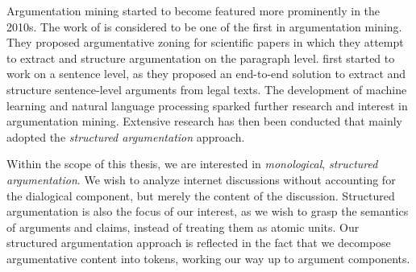 Argumentation mining started to become featured more prominently in the 2010s.
The work of \citet{teufel2009towards} is considered to be one of the first in
argumentation mining. They proposed argumentative zoning for scientific papers
in which they attempt to extract and structure argumentation on the paragraph
level.  \citet{palau2009argumentation} first started to work on a sentence
level, as they proposed an end-to-end solution to extract and structure
sentence-level arguments from legal texts. The development of machine learning
and natural language processing sparked further research and interest in
argumentation mining. Extensive research has then been conducted that mainly
adopted the \emph{structured argumentation} approach.

Within the scope of this thesis, we are interested in \emph{monological},
\emph{structured argumentation}.  We wish to analyze internet discussions without
accounting for the dialogical component, but merely the content of the
discussion. Structured argumentation is also the focus of our interest, as we
wish to grasp the semantics of arguments and claims, instead of treating them
as atomic units. Our structured argumentation approach is reflected in the fact that 
we decompose argumentative content into tokens, working our
way up to argument components. 


% 

